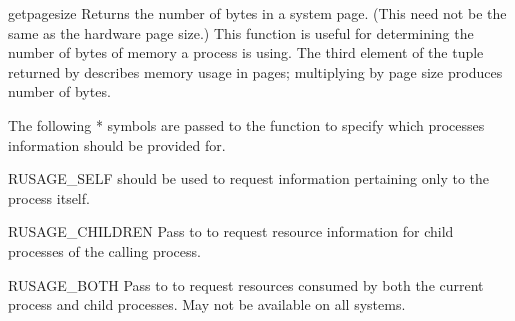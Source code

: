 \begin{funcdesc}{getpagesize}{}
  Returns the number of bytes in a system page. (This need not be the
  same as the hardware page size.) This function is useful for
  determining the number of bytes of memory a process is using. The
  third element of the tuple returned by  describes
  memory usage in pages; multiplying by page size produces number of
  bytes. 
\end{funcdesc}

The following * symbols are passed to the
 function to specify which processes information
should be provided for.

\begin{datadesc}{RUSAGE_SELF}
   should be used to
  request information pertaining only to the process itself.
\end{datadesc}

\begin{datadesc}{RUSAGE_CHILDREN}
  Pass to  to request resource information for child
  processes of the calling process.
\end{datadesc}

\begin{datadesc}{RUSAGE_BOTH}
  Pass to  to request resources consumed by both the
  current process and child processes.  May not be available on all
  systems.
\end{datadesc}
